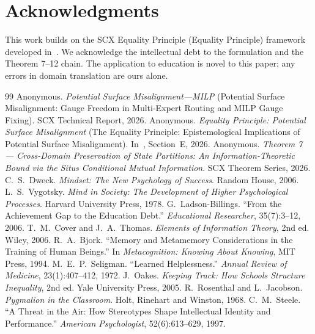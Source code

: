 \documentclass[11pt,a4paper]{article}
\begin{document}
\section*{Acknowledgments}
This work builds on the SCX Equality Principle (Equality Principle) framework developed in~\cite{scx_moe_gauge}. We acknowledge the intellectual debt to the formulation and the Theorem 7--12 chain. The application to education is novel to this paper; any errors in domain translation are ours alone.
\begin{thebibliography}{99}
Anonymous. \textit{Potential Surface Misalignment---MILP} (Potential Surface Misalignment: Gauge Freedom in Multi-Expert Routing and MILP Gauge Fixing). SCX Technical Report, 2026.
Anonymous. \textit{Equality Principle: Potential Surface Misalignment} (The Equality Principle: Epistemological Implications of Potential Surface Misalignment). In~\cite{scx_moe_gauge}, Section~E, 2026.
Anonymous. \textit{Theorem 7 — Cross-Domain Preservation of State Partitions: An Information-Theoretic Bound via the Situs Conditional Mutual Information}. SCX Theorem Series, 2026.
C.~S.~Dweck. \textit{Mindset: The New Psychology of Success}. Random House, 2006.
L.~S.~Vygotsky. \textit{Mind in Society: The Development of Higher Psychological Processes}. Harvard University Press, 1978.
G.~Ladson-Billings. ``From the Achievement Gap to the Education Debt.'' \textit{Educational Researcher}, 35(7):3--12, 2006.
T.~M.~Cover and J.~A.~Thomas. \textit{Elements of Information Theory}, 2nd ed. Wiley, 2006.
R.~A.~Bjork. ``Memory and Metamemory Considerations in the Training of Human Beings.'' In \textit{Metacognition: Knowing About Knowing}, MIT Press, 1994.
M.~E.~P.~Seligman. ``Learned Helplessness.'' \textit{Annual Review of Medicine}, 23(1):407--412, 1972.
J.~Oakes. \textit{Keeping Track: How Schools Structure Inequality}, 2nd ed. Yale University Press, 2005.
R.~Rosenthal and L.~Jacobson. \textit{Pygmalion in the Classroom}. Holt, Rinehart and Winston, 1968.
C.~M.~Steele. ``A Threat in the Air: How Stereotypes Shape Intellectual Identity and Performance.'' \textit{American Psychologist}, 52(6):613--629, 1997.
\end{thebibliography}
\appendix
\end{document}
